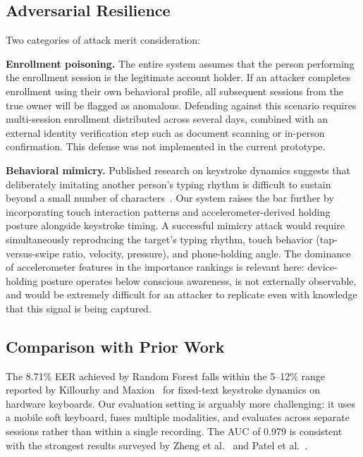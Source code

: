 \documentclass[conference]{IEEEtran}
\begin{document}
\subsection{Adversarial Resilience}

Two categories of attack merit consideration:

\textbf{Enrollment poisoning.} The entire system assumes that the person performing the enrollment session is the legitimate account holder. If an attacker completes enrollment using their own behavioral profile, all subsequent sessions from the true owner will be flagged as anomalous. Defending against this scenario requires multi-session enrollment distributed across several days, combined with an external identity verification step such as document scanning or in-person confirmation. This defense was not implemented in the current prototype.

\textbf{Behavioral mimicry.} Published research on keystroke dynamics suggests that deliberately imitating another person's typing rhythm is difficult to sustain beyond a small number of characters~\cite{teh2017keystroke}. Our system raises the bar further by incorporating touch interaction patterns and accelerometer-derived holding posture alongside keystroke timing. A successful mimicry attack would require simultaneously reproducing the target's typing rhythm, touch behavior (tap-versus-swipe ratio, velocity, pressure), and phone-holding angle. The dominance of accelerometer features in the importance rankings is relevant here: device-holding posture operates below conscious awareness, is not externally observable, and would be extremely difficult for an attacker to replicate even with knowledge that this signal is being captured.

\subsection{Comparison with Prior Work}

The 8.71\% EER achieved by Random Forest falls within the 5--12\% range reported by Killourhy and Maxion~\cite{killourhy2009comparing} for fixed-text keystroke dynamics on hardware keyboards. Our evaluation setting is arguably more challenging: it uses a mobile soft keyboard, fuses multiple modalities, and evaluates across separate sessions rather than within a single recording. The AUC of 0.979 is consistent with the strongest results surveyed by Zheng et al.~\cite{zheng2020survey} and Patel et al.~\cite{patel2016continuous}.
\end{document}
